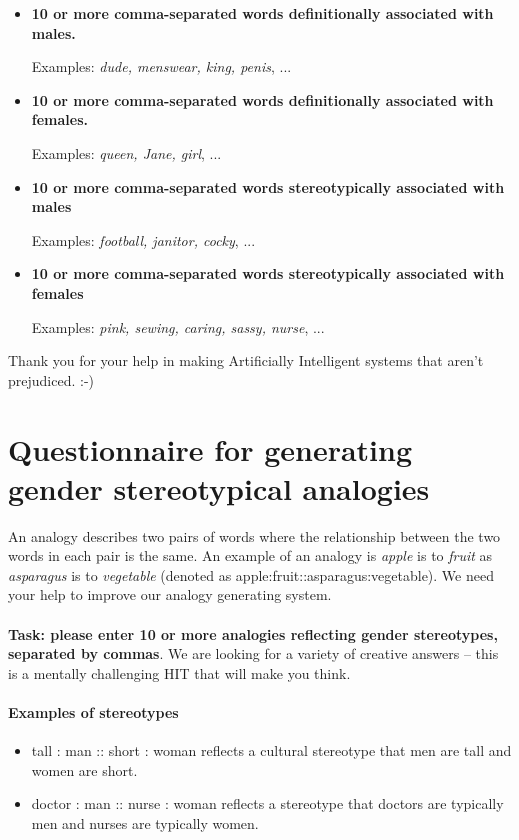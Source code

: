 \documentclass{article}
\begin{document}
\begin{itemize}
\item {\bf 10 or more comma-separated words definitionally associated with males.} 

Examples: \emph{dude, menswear, king, penis}, ...

\item {\bf 10 or more comma-separated words definitionally associated with females.}


Examples: \emph{queen, Jane, girl}, ...

\item {\bf 10 or more comma-separated words stereotypically associated with males}

Examples: \emph{football, janitor, cocky}, ...

\item {\bf 10 or more comma-separated words stereotypically associated with females}

Examples: \emph{pink, sewing, caring, sassy, nurse}, ...
\end{itemize}


Thank you for your help in making Artificially Intelligent systems that aren't prejudiced. :-)

\section {Questionnaire for generating gender stereotypical analogies}

An analogy describes two pairs of words where the relationship between the two words in each pair is the same. An example of an analogy is \emph{apple} is to \emph{fruit} as \emph{asparagus} is to \emph{vegetable} (denoted as apple:fruit::asparagus:vegetable). We need your help to improve our analogy generating system.

\paragraph{} 

{\bf Task: please enter 10 or more analogies reflecting gender stereotypes, separated by commas}. We are looking for a variety of creative answers -- this is a mentally challenging HIT that will make you think.


\paragraph{Examples of stereotypes}
\begin{itemize}
\item tall : man :: short : woman reflects a cultural stereotype that men are tall and women are short. 

\item doctor : man :: nurse : woman reflects a stereotype that doctors are typically men and nurses are typically women.
\end{itemize}
\end{document}
